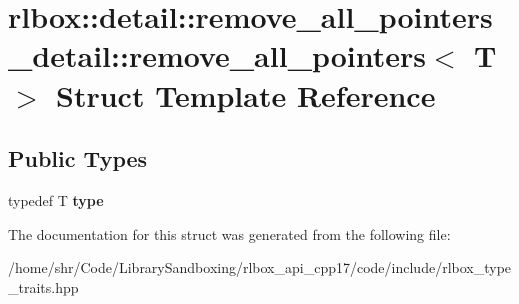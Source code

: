 \hypertarget{structrlbox_1_1detail_1_1remove__all__pointers__detail_1_1remove__all__pointers}{}\section{rlbox\+:\+:detail\+:\+:remove\+\_\+all\+\_\+pointers\+\_\+detail\+:\+:remove\+\_\+all\+\_\+pointers$<$ T $>$ Struct Template Reference}
\label{structrlbox_1_1detail_1_1remove__all__pointers__detail_1_1remove__all__pointers}
\subsection*{Public Types}
\begin{DoxyCompactItemize}
\item 
\mbox{\label{structrlbox_1_1detail_1_1remove__all__pointers__detail_1_1remove__all__pointers_a663cf46e4718616fdf4d4a03e01d156e}} 
typedef T {\bfseries type}
\end{DoxyCompactItemize}


The documentation for this struct was generated from the following file\+:\begin{DoxyCompactItemize}
\item 
/home/shr/\+Code/\+Library\+Sandboxing/rlbox\+\_\+api\+\_\+cpp17/code/include/rlbox\+\_\+type\+\_\+traits.\+hpp\end{DoxyCompactItemize}
